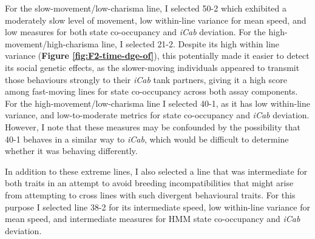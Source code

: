 \documentclass[
]{book}
\begin{document}
For the slow-movement/low-charisma line, I selected \textcolor{50-2_BB81FF}{50-2} which exhibited a moderately slow level of movement, low within-line variance for mean speed, and low measures for both state co-occupancy and \emph{\textcolor{iCab_424B4D}{iCab}} deviation. For the high-movement/high-charisma line, I selected \textcolor{21-2_49B500}{21-2}. Despite its high within line variance (\textbf{Figure \ref{fig:F2-time-dge-of}}), this potentially made it easier to detect its social genetic effects, as the slower-moving individuals appeared to transmit those behaviours strongly to their \emph{\textcolor{iCab_424B4D}{iCab}} tank partners, giving it a high score among fast-moving lines for state co-occupancy across both assay components. For the high-movement/low-charisma line I selected \textcolor{40-1_93AA00}{40-1}, as it has low within-line variance, and low-to-moderate metrics for state co-occupancy and \emph{\textcolor{iCab_424B4D}{iCab}} deviation. However, I note that these measures may be confounded by the possibility that \textcolor{40-1_93AA00}{40-1} behaves in a similar way to \emph{\textcolor{iCab_424B4D}{iCab}}, which would be difficult to determine whether it was behaving differently.

In addition to these extreme lines, I also selected a line that was intermediate for both traits in an attempt to avoid breeding incompatibilities that might arise from attempting to cross lines with such divergent behavioural traits. For this purpose I selected line \textcolor{38-2_00C08B}{38-2} for its intermediate speed, low within-line variance for mean speed, and intermediate measures for HMM state co-occupancy and \emph{\textcolor{iCab_424B4D}{iCab}} deviation.
\end{document}
